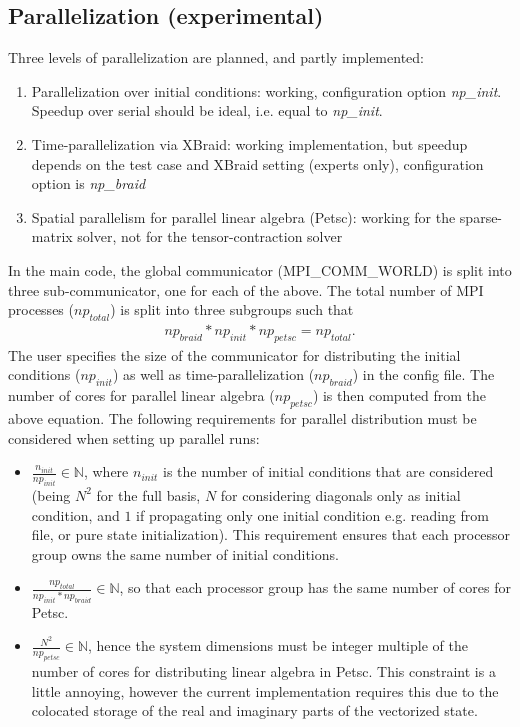 \documentclass[11pt]{article}
\begin{document}
    \subsection{Parallelization (experimental)}
    Three levels of parallelization are planned, and partly implemented: 
    \begin{enumerate}
    \item Parallelization over initial conditions: working, configuration
      option \textit{np\_init}. Speedup over serial should be ideal, i.e.
      equal to \textit{np\_init}.
    \item Time-parallelization via XBraid: working implementation, but
      speedup depends on the test case and XBraid setting (experts only),
      configuration option is \textit{np\_braid}
    \item Spatial parallelism for parallel linear algebra (Petsc): working
      for the sparse-matrix solver, not for the tensor-contraction solver
    \end{enumerate}
    In the main code, the global communicator (MPI\_COMM\_WORLD) is split into
    three sub-communicator, one for each of the above. The total number of MPI
    processes ($np_{total}$) is split into three subgroups such that 
    \begin{align*}
      np_{braid} * np_{init} * np_{petsc} = np_{total}.
    \end{align*}
    The user specifies the size of the communicator for distributing the
    initial conditions ($np_{init}$) as well as time-parallelization
    ($np_{braid}$) in the config file. The number of cores for parallel linear
    algebra ($np_{petsc}$) is then computed from the above equation. The
    following requirements for parallel distribution must be considered when
    setting up parallel runs:
    \begin{itemize}
    \item $\frac{n_{init}}{np_{init}} \in \mathds{N}$, where $n_{init}$ is
      the number of initial conditions that are considered (being $N^2$ for
      the full basis, $N$ for considering diagonals only as initial
      condition, and $1$ if propagating only one initial condition e.g.
      reading from file, or pure state initialization). This requirement
      ensures that each processor group owns the same number of initial
      conditions.
    \item $\frac{np_{total}}{np_{init}*np_{braid}} \in \mathds{N}$, so that
      each processor group has the same number of cores for Petsc.
    \item $\frac{N^2}{np_{petsc}} \in \mathds{N}$, hence the system
      dimensions must be integer multiple of the number of cores for
      distributing linear algebra in Petsc. This constraint is a little
      annoying, however the current implementation requires this due to the
      colocated storage of the real and imaginary parts of the vectorized
      state.
    \end{itemize}
\end{document}
